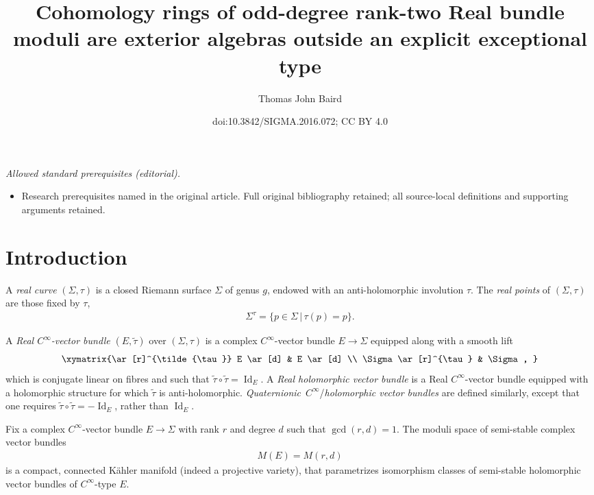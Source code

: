 \documentclass[10pt,a4paper]{amsart}
\title{Cohomology rings of odd-degree rank-two Real bundle moduli are exterior algebras outside an explicit exceptional type}
\author{Thomas John Baird}
\date{doi:10.3842/SIGMA.2016.072; CC BY 4.0}
\numberwithin{equation}{section}
\begin{document}
\maketitle
\noindent\textit{Allowed standard prerequisites (editorial).}\begin{itemize}
\item Research prerequisites named in the original article. Full original bibliography retained; all source-local definitions and supporting arguments retained.
\end{itemize}\medskip
\section{Introduction} A \emph{real curve} $(\Sigma, \tau)$ is a closed Riemann surface $\Sigma$ of genus $g$, endowed with an anti-holomorphic involution $\tau$. The \emph{real points} of $(\Sigma, \tau)$ are those f\/ixed by $\tau$,
\begin{gather*}\Sigma^{\tau} = \{ p \in \Sigma\,|\, \tau(p)= p\}.\end{gather*}

 A \emph{Real $C^{\infty}$-vector bundle} $(E,\tilde{\tau})$ over $(\Sigma,\tau)$ is a complex $C^{\infty}$-vector bundle $E \rightarrow \Sigma$ equipped along with a smooth lift
\begin{gather*}\xymatrix{\ar[r]^{\tilde{\tau}} E \ar[d] & E \ar[d] \\
 \Sigma \ar[r]^{\tau} & \Sigma, }\end{gather*}
which is conjugate linear on f\/ibres and such that $\tilde{\tau} \circ \tilde{\tau} = \operatorname{Id}_E$. A \emph{Real holomorphic vector bundle} is a Real $C^{\infty}$-vector bundle equipped with a holomorphic structure for which $\tilde{\tau}$ is anti-holomorphic. \emph{Quaternionic}~$C^{\infty}$/\emph{holomorphic vector bundles} are def\/ined similarly, except that one requires $\tilde{\tau} \circ \tilde{\tau} = -\operatorname{Id}_E$, rather than $\operatorname{Id}_E$.

Fix a complex $C^{\infty}$-vector bundle $E \rightarrow \Sigma$ with rank $r$ and degree $d$ such that $\operatorname{gcd}(r,d) =1$. The moduli space of semi-stable complex vector bundles
\begin{gather*} M(E) = M(r,d)\end{gather*}
is a compact, connected K\"ahler manifold (indeed a projective variety), that parametrizes isomorphism classes of semi-stable holomorphic vector bundles of $C^{\infty}$-type $E$.
\end{document}
